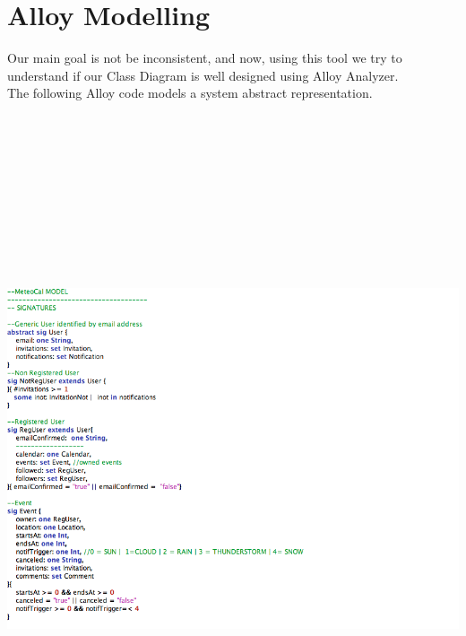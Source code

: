 \documentclass[12pt]{book}
\begin{document}
\chapter{Alloy Modelling}
Our main goal is not be inconsistent, and now, using this tool we try to understand if our Class Diagram is well designed using Alloy Analyzer. \\
The following Alloy code models a system abstract representation. \\
\newpage
\includegraphics[width=19cm,height=21cm]{Alloy1}\\
\newpage
\end{document}

